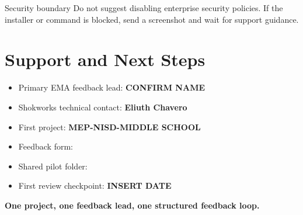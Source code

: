 \begin{warnbox}{Security boundary}
Do not suggest disabling enterprise security policies. If the installer or command is blocked, send a screenshot and wait for support guidance.
\end{warnbox}

\section{Support and Next Steps}
\begin{itemize}
  \item Primary EMA feedback lead: \textbf{CONFIRM NAME}
  \item Shokworks technical contact: \textbf{Eliuth Chavero}
  \item First project: \textbf{MEP-NISD-MIDDLE SCHOOL}
  \item Feedback form: 
  \item Shared pilot folder: 
  \item First review checkpoint: \textbf{INSERT DATE}
\end{itemize}

\begin{center}
\vspace{0.2in}
{\Large\bfseries\color{EMA Navy} One project, one feedback lead, one structured feedback loop.}
\end{center}
